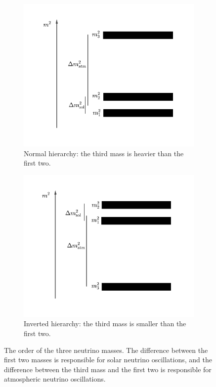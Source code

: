 \begin{figure}[htp]
	\centering
	\begin{subfigure}[t]{0.48\textwidth}
		\centering
		\includegraphics[width=\textwidth]{chapters/assets/basics/masses-nh}
		\caption{Normal hierarchy: the third mass is heavier than the first two.}
    \label{chap:basics-sec:flavor-isospin-pic-fig:masses-nh}
	\end{subfigure}
	\quad
	\begin{subfigure}[t]{0.48\textwidth}
		\centering
		\includegraphics[width=\textwidth]{chapters/assets/basics/masses-ih}
		\caption{Inverted hierarchy: the third mass is smaller than the first two.}
    \label{chap:basics-sec:flavor-isospin-pic-fig:masses-ih}
	\end{subfigure}
	\caption{The order of the three neutrino masses. The difference between the first two masses is responsible for solar neutrino oscillations, and the difference between the third mass and the first two is responsible for atmospheric neutrino oscillations.}
    \label{chap:basics-sec:flavor-isospin-pic-fig:masses}
\end{figure}

